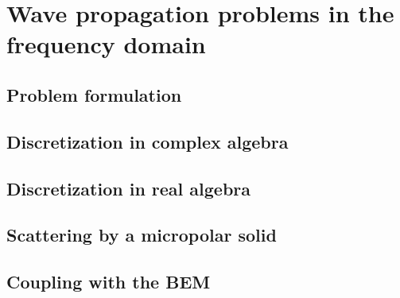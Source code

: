 
\chapter{Wave propagation problems in the frequency domain}

\section{Problem formulation}

\section{Discretization in complex algebra}

\section{Discretization in real algebra}

\section{Scattering by a micropolar solid}

\section{Coupling with the BEM}

